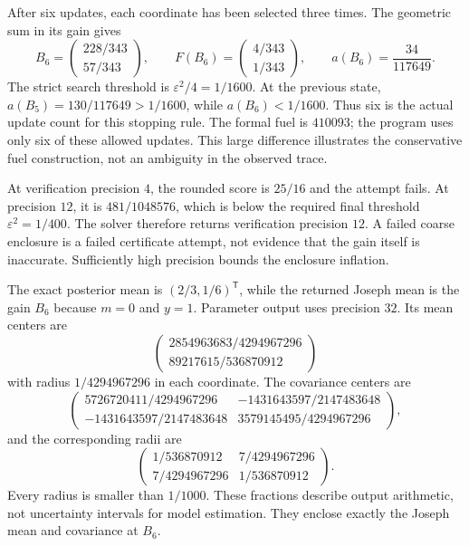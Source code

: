 After six updates, each coordinate has been selected three times. The geometric
sum in its gain gives
\[
 B_6=\begin{pmatrix}228/343\\57/343\end{pmatrix},\qquad
 F(B_6)=\begin{pmatrix}4/343\\1/343\end{pmatrix},\qquad
 a(B_6)=\frac{34}{117649}.
\]
The strict search threshold is $\varepsilon^2/4=1/1600$. At the previous state,
$a(B_5)=130/117649>1/1600$, while $a(B_6)<1/1600$. Thus six is the actual update
count for this stopping rule. The formal fuel is $410093$; the program uses only
six of these allowed updates. This large difference illustrates the conservative
fuel construction, not an ambiguity in the observed trace.

At verification precision $4$, the rounded score is $25/16$ and the attempt fails.
At precision $12$, it is $481/1048576$, which is below the required final threshold
$\varepsilon^2=1/400$. The solver therefore returns verification precision $12$.
A failed coarse enclosure is a failed certificate attempt, not evidence that the
gain itself is inaccurate. Sufficiently high precision bounds the enclosure inflation.

The exact posterior mean is $(2/3,1/6)^{\mathsf T}$, while the returned Joseph mean
is the gain $B_6$ because $m=0$ and $y=1$. Parameter output uses precision $32$.
Its mean centers are
\[
 \begin{pmatrix}2854963683/4294967296\\89217615/536870912\end{pmatrix}
\]
with radius $1/4294967296$ in each coordinate. The covariance centers are
\[
 \begin{pmatrix}
 5726720411/4294967296 & -1431643597/2147483648\\
 -1431643597/2147483648 & 3579145495/4294967296
 \end{pmatrix},
\]
and the corresponding radii are
\[
 \begin{pmatrix}
 1/536870912&7/4294967296\\
 7/4294967296&1/536870912
 \end{pmatrix}.
\]
Every radius is smaller than $1/1000$. These fractions describe output arithmetic,
not uncertainty intervals for model estimation. They enclose exactly the Joseph
mean and covariance at $B_6$.

